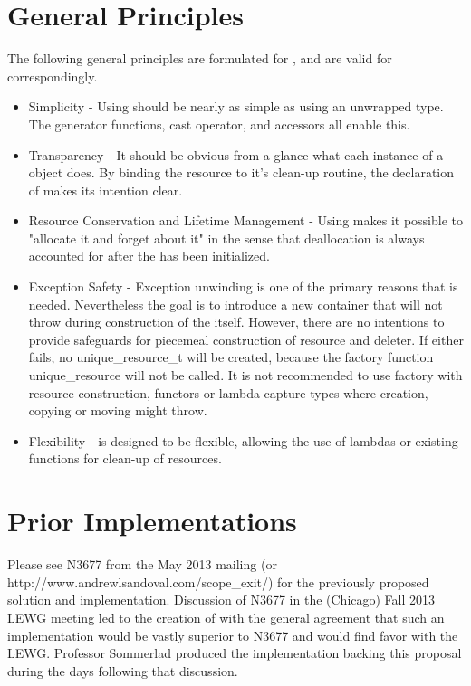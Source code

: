 \documentclass[ebook,11pt,article]{memoir}
\begin{document}
\section{General Principles}
The following general principles are formulated for , and are valid for  correspondingly.
\begin{itemize}
\item Simplicity - Using  should be nearly as simple as using an unwrapped type.  The generator functions, cast operator, and accessors all enable this.
\item Transparency - It should be obvious from a glance what each instance of a  object does.  By binding the resource to it's clean-up routine, the declaration of  makes its intention clear.
\item Resource Conservation and Lifetime Management - Using  makes it possible to "allocate it and forget about it" in the sense that deallocation is always accounted for after the  has been initialized.
\item Exception Safety - Exception unwinding is one of the primary reasons that  is needed.  Nevertheless the goal is to introduce a new container that will not throw during construction of the  itself. However, there are no intentions to provide safeguards for piecemeal construction of resource and deleter. If either fails, no unique_resource_t will be created, because the factory function unique_resource will not be called. It is not recommended to use  factory with resource construction, functors or lambda capture types where creation, copying or moving might throw.
\item Flexibility -  is designed to be flexible, allowing the use of lambdas or existing functions for clean-up of resources. 
\end{itemize}

\section{Prior Implementations}
Please see N3677 from the May 2013 mailing (or http://www.andrewlsandoval.com/scope_exit/) for the previously proposed solution and implementation.  Discussion of N3677 in the (Chicago) Fall 2013 LEWG meeting led to the creation of  with the general agreement that such an implementation would be vastly superior to N3677 and would find favor with the LEWG.  Professor Sommerlad produced the implementation backing this proposal during the days following that discussion.
\end{document}
